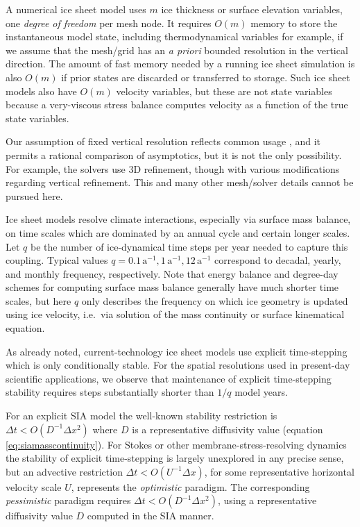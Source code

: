 \documentclass[twocolumn,letterpaper]{igs}
\begin{document}
A numerical ice sheet model uses $m$ ice thickness or surface elevation variables, one \emph{degree of freedom} per mesh node.  It requires $O(m)$ memory to store the instantaneous model state, including thermodynamical variables for example, if we assume that the mesh/grid has an \emph{a priori} bounded resolution in the vertical direction.  The amount of fast memory needed by a running ice sheet simulation is also $O(m)$ if prior states are discarded or transferred to storage.  Such ice sheet models also have $O(m)$ velocity variables, but these are not state variables because a very-viscous stress balance computes velocity as a function of the true state variables.

Our assumption of fixed vertical resolution reflects common usage \citep[for example]{Aschwandenetal2019,BrinkerhoffJohnson2015,Hoffmanetal2018,Lengetal2012,
Winkelmannetal2011}, and it permits a rational comparison of asymptotics, but it is not the only possibility.  For example, the \cite{BrownSmithAhmadia2013,IsaacStadlerGhattas2015,Tuminaroetal2016} solvers use 3D refinement, though with various modifications regarding vertical refinement.  This and many other mesh/solver details cannot be pursued here.

Ice sheet models resolve climate interactions, especially via surface mass balance, on time scales which are dominated by an annual cycle and certain longer scales.  Let $q$ be the number of ice-dynamical time steps per year needed to capture this coupling.  Typical values $q=0.1 \,\text{a}^{-1}, 1 \,\text{a}^{-1}, 12 \,\text{a}^{-1}$ correspond to decadal, yearly, and monthly frequency, respectively.  Note that energy balance and degree-day schemes for computing surface mass balance generally have much shorter time scales, but here $q$ only describes the frequency on which ice geometry is updated using ice velocity, i.e.~via solution of the mass continuity or surface kinematical equation.

As already noted, current-technology ice sheet models use explicit time-stepping which is only conditionally stable.  For the spatial resolutions used in present-day scientific applications, we observe that maintenance of explicit time-stepping stability requires steps substantially shorter than $1/q$ model years.

For an explicit SIA model the well-known stability restriction is $\Delta t < O(D^{-1} \Delta x^2)$ \citep{Bueleretal2005,HindmarshPayne1996} where $D$ is a representative diffusivity value (equation \eqref{eq:siamasscontinuity}).  For Stokes or other membrane-stress-resolving dynamics the stability of explicit time-stepping is largely unexplored in any precise sense, but an advective restriction $\Delta t < O(U^{-1} \Delta x)$, for some representative horizontal velocity scale $U$, represents the \emph{optimistic} paradigm.  The corresponding \emph{pessimistic} paradigm requires $\Delta t < O(D^{-1} \Delta x^2)$, using a representative diffusivity value $D$ computed in the SIA manner.
\end{document}
